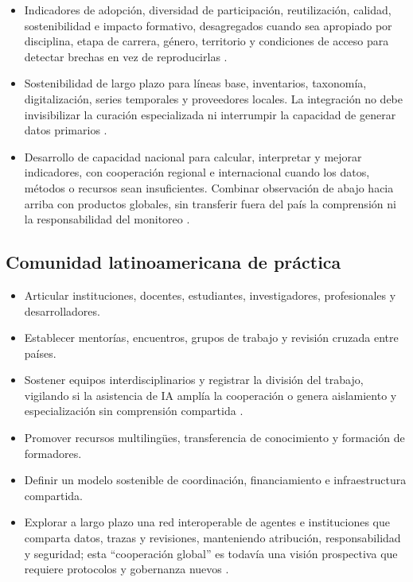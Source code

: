 \documentclass[11pt,a4paper]{article}
\begin{document}
\begin{itemize}
  \citep{westerlaken2024digital}.
  \item Indicadores de adopción, diversidad de participación, reutilización,
  calidad, sostenibilidad e impacto formativo, desagregados cuando sea apropiado
  por disciplina, etapa de carrera, género, territorio y condiciones de acceso para
  detectar brechas en vez de reproducirlas \citep{gao2024quantifying}.
   \item Sostenibilidad de largo plazo para líneas base, inventarios, taxonomía,
  digitalización, series temporales y proveedores locales. La integración no debe
  invisibilizar la curación especializada ni interrumpir la capacidad de generar
  datos primarios \citep{paton2009biodiversity,feng2022databases}.
  \item Desarrollo de capacidad nacional para calcular, interpretar y mejorar
  indicadores, con cooperación regional e internacional cuando los datos, métodos
  o recursos sean insuficientes. Combinar observación de abajo hacia arriba con
  productos globales, sin transferir fuera del país la comprensión ni la
  responsabilidad del monitoreo \citep{affinito2024monitoring,jetz2019ebv}.
\end{itemize}

\subsection{Comunidad latinoamericana de práctica}

\begin{itemize}
  \item Articular instituciones, docentes, estudiantes, investigadores,
  profesionales y desarrolladores.
  \item Establecer mentorías, encuentros, grupos de trabajo y revisión
  cruzada entre países.
  \item Sostener equipos interdisciplinarios y registrar la división del trabajo,
  vigilando si la asistencia de IA amplía la cooperación o genera aislamiento y
  especialización sin comprensión compartida \citep{zheng2026scientific}.
  \item Promover recursos multilingües, transferencia de conocimiento y
  formación de formadores.
  \item Definir un modelo sostenible de coordinación, financiamiento e
  infraestructura compartida.
  \item Explorar a largo plazo una red interoperable de agentes e instituciones
  que comparta datos, trazas y revisiones, manteniendo atribución,
  responsabilidad y seguridad; esta ``cooperación global'' es todavía una visión
  prospectiva que requiere protocolos y gobernanza nuevos
  \citep{wei2025agentic}.
\end{itemize}
\end{document}
